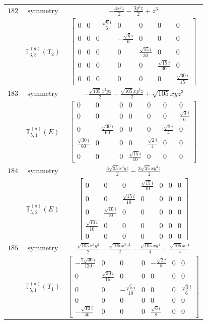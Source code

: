 \documentclass[fleqn,8pt,landscape]{jsarticle}
\begin{document}
\begin{longtable}{ccc}
$ 182 $ & $ \text{symmetry} $ & $ - \frac{3 x^{2} z}{2} - \frac{3 y^{2} z}{2} + z^{3} $ \\
$  $ & $ \mathbb{T}_{3,3}^{(a)}(T_{2}) $ & $ \begin{bmatrix} 0 & 0 & - \frac{\sqrt{6} i}{6} & 0 & 0 & 0 & 0 \\ 0 & 0 & 0 & - \frac{\sqrt{6} i}{6} & 0 & 0 & 0 \\ 0 & 0 & 0 & 0 & \frac{\sqrt{15} i}{30} & 0 & 0 \\ 0 & 0 & 0 & 0 & 0 & \frac{\sqrt{15} i}{30} & 0 \\ 0 & 0 & 0 & 0 & 0 & 0 & \frac{\sqrt{30} i}{15} \end{bmatrix} $ \\ \hline
$ 183 $ & $ \text{symmetry} $ & $ - \frac{\sqrt{105} x^{3} y z}{2} - \frac{\sqrt{105} x y^{3} z}{2} + \sqrt{105} x y z^{3} $ \\
$  $ & $ \mathbb{T}_{5,1}^{(a)}(E) $ & $ \begin{bmatrix} 0 & 0 & 0 & 0 & 0 & 0 & 0 \\ 0 & 0 & 0 & 0 & 0 & 0 & \frac{\sqrt{3} i}{6} \\ 0 & - \frac{\sqrt{30} i}{60} & 0 & 0 & 0 & \frac{\sqrt{2} i}{4} & 0 \\ \frac{\sqrt{30} i}{60} & 0 & 0 & 0 & \frac{\sqrt{2} i}{4} & 0 & 0 \\ 0 & 0 & 0 & \frac{\sqrt{15} i}{10} & 0 & 0 & 0 \end{bmatrix} $ \\ \hline
$ 184 $ & $ \text{symmetry} $ & $ \frac{3 \sqrt{35} x^{3} y z}{2} - \frac{3 \sqrt{35} x y^{3} z}{2} $ \\
$  $ & $ \mathbb{T}_{5,2}^{(a)}(E) $ & $ \begin{bmatrix} 0 & 0 & 0 & \frac{\sqrt{15} i}{10} & 0 & 0 & 0 \\ 0 & 0 & \frac{\sqrt{15} i}{10} & 0 & 0 & 0 & 0 \\ 0 & \frac{\sqrt{10} i}{10} & 0 & 0 & 0 & 0 & 0 \\ \frac{\sqrt{10} i}{10} & 0 & 0 & 0 & 0 & 0 & 0 \\ 0 & 0 & 0 & 0 & 0 & 0 & 0 \end{bmatrix} $ \\ \hline
$ 185 $ & $ \text{symmetry} $ & $ \frac{\sqrt{105} x^{3} y^{2}}{2} - \frac{\sqrt{105} x^{3} z^{2}}{2} - \frac{\sqrt{105} x y^{4}}{4} + \frac{\sqrt{105} x z^{4}}{4} $ \\
$  $ & $ \mathbb{T}_{5,1}^{(a)}(T_{1}) $ & $ \begin{bmatrix} - \frac{7 \sqrt{30} i}{120} & 0 & 0 & 0 & - \frac{\sqrt{2} i}{8} & 0 & 0 \\ 0 & \frac{\sqrt{30} i}{15} & 0 & 0 & 0 & 0 & 0 \\ 0 & 0 & - \frac{\sqrt{5} i}{10} & 0 & 0 & 0 & \frac{\sqrt{3} i}{6} \\ 0 & 0 & 0 & 0 & 0 & 0 & 0 \\ - \frac{\sqrt{10} i}{40} & 0 & 0 & 0 & \frac{\sqrt{6} i}{8} & 0 & 0 \end{bmatrix} $ \\ \hline

\end{longtable}
\end{document}
